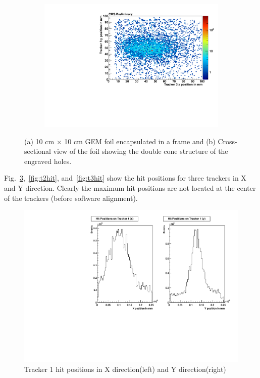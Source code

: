 \begin{figure}[!htbp]
\begin{subfigure}[b]{0.46\textwidth}
        \includegraphics[scale=0.35]{figures/GEM/profile_plots_for_Tracker3_Run1897.pdf}
        \caption{ }
        \label{fig:t3bp}
    \end{subfigure}
   \caption{(a) 10 cm $\times$ 10 cm GEM foil encapsulated in a frame and (b) Cross-sectional view of the foil showing the double cone structure of the engraved holes. } \label{fig:Foil_and_Cone}
\end{figure}
Fig.~\ref{fig:t1hit},~\ref{fig:t2hit}, and~\ref{fig:t3hit} show the hit positions for three trackers in X and Y direction. Clearly the maximum hit positions are not located at the center of the trackers (before software alignment).
\begin{figure}[!htbp]
\centering
\includegraphics[width=5.1in]{figures/GEM/Tracker1_Hit_position_Run1897.pdf}
\caption{Tracker 1 hit positions in X direction(left) and Y direction(right)}\label{fig:t1hit}
\end{figure}
